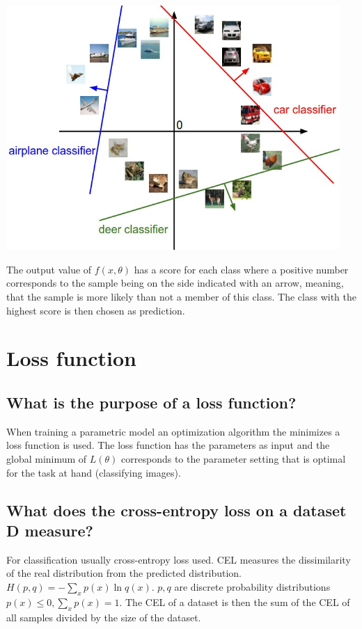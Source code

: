 \begin{minipage}{0.32\textwidth}
\includegraphics[width=0.95\textwidth]{./img/lclass.jpeg}
\end{minipage}\begin{minipage}{0.7\textwidth}
The output value of $f(x, \theta)$ has a score for each class where a positive number corresponds to the sample being on the side indicated with an arrow, meaning, that the sample is more likely than not a member of this class. The class with the highest score is then chosen as prediction. 
\end{minipage}
%
\section{Loss function}
\subsection{What is the purpose of a loss function?}
When training a parametric model an optimization algorithm the minimizes a loss function is used. The loss function has the parameters as input and the global minimum of $L(\theta)$ corresponds to the parameter setting that is optimal for the task at hand (classifying images).
\subsection{What does the cross-entropy loss on a dataset D measure?}
For classification usually cross-entropy loss used. CEL measures the dissimilarity of the real distribution from the predicted distribution. $H(p,q) = -\sum_x p(x) \ln q(x)$. $p,q$ are discrete probability distributions $p(x)\leq 0, \sum_x p(x) = 1$. The CEL of a dataset is then the sum of the CEL of all samples divided by the size of the dataset. 
